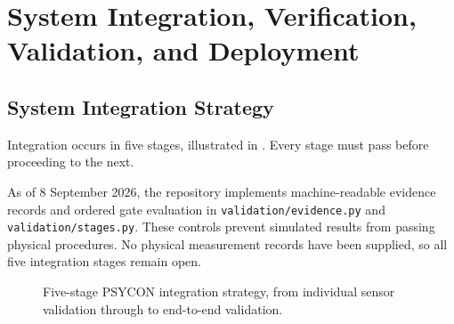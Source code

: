 \section{System Integration, Verification, Validation, and Deployment}
\label{sec:integration-verification}

\subsection{System Integration Strategy}
\label{sec:integration-strategy}

Integration occurs in five stages, illustrated in . Every stage must pass before proceeding to the next.

\begin{validationbox}
As of 8 September 2026, the repository implements machine-readable evidence records and ordered gate evaluation in \texttt{validation/evidence.py} and \texttt{validation/stages.py}. These controls prevent simulated results from passing physical procedures. No physical measurement records have been supplied, so all five integration stages remain open.
\end{validationbox}

\begin{figure}[H]
\centering
{}
\caption{Five-stage PSYCON integration strategy, from individual sensor validation through to end-to-end validation.}
\label{fig:integration-stages}
\end{figure}


